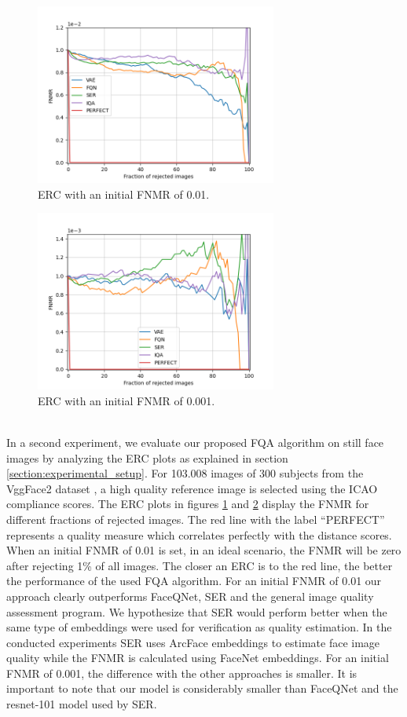 \documentclass[letterpaper]{article} %
\begin{document}
\begin{figure}[t]
    \centering
    \includegraphics[width=225pt]{figures/FNMR_01.png}
    \caption{ERC with an initial FNMR of 0.01.}
    \label{fig:vggface2_fnmr_01}
\end{figure}
\begin{figure}[h]
    \centering
    \includegraphics[width=225pt]{figures/FNMR_001.png}
    \caption{ERC with an initial FNMR of 0.001.}
    \label{fig:vggface2_fnmr_001}
\end{figure}
\\
\newline
In a second experiment, we evaluate our proposed FQA algorithm on still face images by analyzing the ERC plots as explained in section \ref{section:experimental_setup}. For 103.008 images of 300 subjects from the VggFace2 dataset \cite{Cao18}, a high quality reference image is selected using the ICAO compliance scores. The ERC plots in figures \ref{fig:vggface2_fnmr_01} and \ref{fig:vggface2_fnmr_001} display the FNMR for different fractions of rejected images. The red line with the label ``PERFECT'' represents a quality measure which correlates perfectly with the distance scores. When an initial FNMR of 0.01 is set, in an ideal scenario, the FNMR will be zero after rejecting 1\% of all images. The closer an ERC is to the red line, the better the performance of the used FQA algorithm. For an initial FNMR of 0.01 our approach clearly outperforms FaceQNet, SER and the general image quality assessment program. We hypothesize that SER would perform better when the same type of embeddings were used for verification as quality estimation. In the conducted experiments SER uses ArcFace \cite{deng2018arcface} embeddings to estimate face image quality while the FNMR is calculated using FaceNet embeddings. For an initial FNMR of 0.001, the difference with the other approaches is smaller. It is important to note that our model is considerably smaller than FaceQNet and the resnet-101 model \cite{he2016deep} used by SER.
\end{document}

